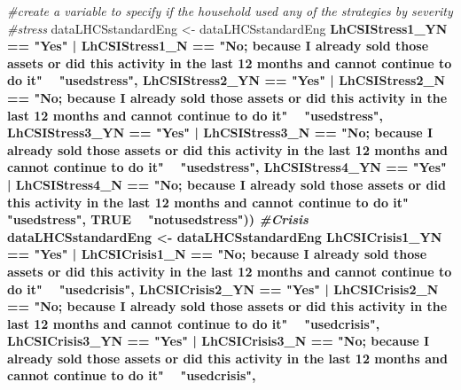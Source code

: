 \documentclass[
]{article}
\newenvironment{Shaded}{\begin{snugshade}}{\end{snugshade}}
\newcommand{\CommentTok}[1]{\textcolor[rgb]{0.56,0.35,0.01}{\textit{#1}}}
\newcommand{\DataTypeTok}[1]{\textcolor[rgb]{0.13,0.29,0.53}{#1}}
\newcommand{\KeywordTok}[1]{\textcolor[rgb]{0.13,0.29,0.53}{\textbf{#1}}}
\newcommand{\NormalTok}[1]{#1}
\newcommand{\OperatorTok}[1]{\textcolor[rgb]{0.81,0.36,0.00}{\textbf{#1}}}
\newcommand{\OtherTok}[1]{\textcolor[rgb]{0.56,0.35,0.01}{#1}}
\newcommand{\StringTok}[1]{\textcolor[rgb]{0.31,0.60,0.02}{#1}}
\begin{document}
\begin{Shaded}
\begin{Highlighting}[]
\CommentTok{#create a variable to specify if the household used any of the strategies by severity }
\CommentTok{#stress}
\NormalTok{dataLHCSstandardEng <-}\StringTok{ }\NormalTok{dataLHCSstandardEng }\OperatorTok{%>%}\StringTok{ }\KeywordTok{mutate}\NormalTok{(}\DataTypeTok{stress_coping =} \KeywordTok{case_when}\NormalTok{(}
\NormalTok{LhCSIStress1_YN }\OperatorTok{==}\StringTok{ "Yes"} \OperatorTok{|}\StringTok{ }\NormalTok{LhCSIStress1_N }\OperatorTok{==}\StringTok{ "No; because I already sold those assets or did this activity in the last 12 months and cannot continue to do it"} \OperatorTok{~}\StringTok{ "usedstress"}\NormalTok{,}
\NormalTok{LhCSIStress2_YN }\OperatorTok{==}\StringTok{ "Yes"} \OperatorTok{|}\StringTok{ }\NormalTok{LhCSIStress2_N }\OperatorTok{==}\StringTok{ "No; because I already sold those assets or did this activity in the last 12 months and cannot continue to do it"} \OperatorTok{~}\StringTok{ "usedstress"}\NormalTok{, }
\NormalTok{LhCSIStress3_YN }\OperatorTok{==}\StringTok{ "Yes"} \OperatorTok{|}\StringTok{ }\NormalTok{LhCSIStress3_N }\OperatorTok{==}\StringTok{ "No; because I already sold those assets or did this activity in the last 12 months and cannot continue to do it"} \OperatorTok{~}\StringTok{ "usedstress"}\NormalTok{,}
\NormalTok{LhCSIStress4_YN }\OperatorTok{==}\StringTok{ "Yes"} \OperatorTok{|}\StringTok{ }\NormalTok{LhCSIStress4_N }\OperatorTok{==}\StringTok{ "No; because I already sold those assets or did this activity in the last 12 months and cannot continue to do it"} \OperatorTok{~}\StringTok{ "usedstress"}\NormalTok{,}
\OtherTok{TRUE} \OperatorTok{~}\StringTok{ "notusedstress"}\NormalTok{))}
\CommentTok{#Crisis}
\NormalTok{dataLHCSstandardEng <-}\StringTok{ }\NormalTok{dataLHCSstandardEng }\OperatorTok{%>%}\StringTok{ }\KeywordTok{mutate}\NormalTok{(}\DataTypeTok{crisis_coping =} \KeywordTok{case_when}\NormalTok{(}
\NormalTok{LhCSICrisis1_YN }\OperatorTok{==}\StringTok{ "Yes"} \OperatorTok{|}\StringTok{ }\NormalTok{LhCSICrisis1_N }\OperatorTok{==}\StringTok{ "No; because I already sold those assets or did this activity in the last 12 months and cannot continue to do it"} \OperatorTok{~}\StringTok{ "usedcrisis"}\NormalTok{,}
\NormalTok{LhCSICrisis2_YN }\OperatorTok{==}\StringTok{ "Yes"} \OperatorTok{|}\StringTok{ }\NormalTok{LhCSICrisis2_N }\OperatorTok{==}\StringTok{ "No; because I already sold those assets or did this activity in the last 12 months and cannot continue to do it"} \OperatorTok{~}\StringTok{ "usedcrisis"}\NormalTok{,}
\NormalTok{LhCSICrisis3_YN }\OperatorTok{==}\StringTok{ "Yes"} \OperatorTok{|}\StringTok{ }\NormalTok{LhCSICrisis3_N }\OperatorTok{==}\StringTok{ "No; because I already sold those assets or did this activity in the last 12 months and cannot continue to do it"} \OperatorTok{~}\StringTok{ "usedcrisis"}\NormalTok{,}
}}
\end{Highlighting}
\end{Shaded}
\end{document}
